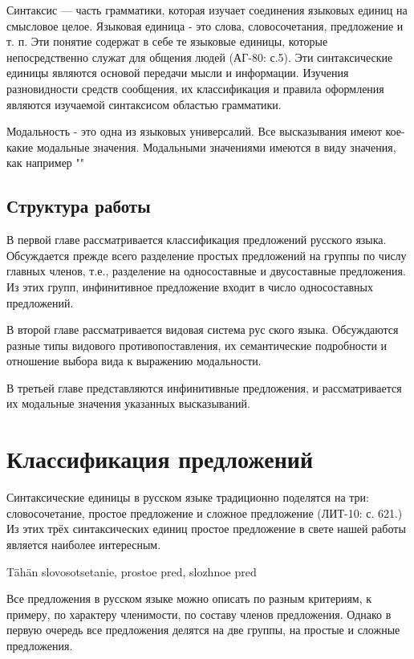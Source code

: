 \documentclass{article}
\begin{document}
Синтаксис --- часть грамматики, которая изучает соединения языковых единиц на смысловое целое. Языковая единица - это слова, словосочетания, предложение и т. п. Эти понятие содержат в себе те языковые единицы, которые непосредственно служат для общения людей (АГ-80: с.5). Эти синтаксические единицы являются основой передачи мысли и информации. Изучения разновидности средств сообщения, их классификация и правила оформления являются изучаемой синтаксисом областью грамматики.

Модальность - это одна из языковых универсалий. Все высказывания имеют кое-какие модальные значения. Модальными значениями имеются в виду значения, как например "" 


\subsection*{Структура работы}

В первой главе рассматривается классификация предложений русского языка. Обсуждается прежде всего разделение простых предложений на группы по числу главных членов, т.е., разделение на односоставные и двусоставные предложения. Из этих групп, инфинитивное предложение входит в число односоставных предложений.

В второй главе рассматривается видовая система рус ского языка. Обсуждаются разные типы видового противопоставления, их семантические подробности и отношение выбора вида к выражению модальности.  

В третьей главе представляются инфинитивные предложения, и рассматривается их модальные значения указанных высказываний.


\section{Классификация предложений}


 Синтаксические единицы в русском языке традиционно поделятся на три: словосочетание, простое предложение и сложное предложение (ЛИТ-10: с. 621.) Из этих трёх синтаксических единиц простое предложение в свете нашей работы является наиболее интересным. 



Tähän slovosotsetanie, prostoe pred, slozhnoe pred



Все предложения в русском языке можно описать по разным критериям, к примеру, по характеру членимости, по составу членов предложения. Однако в первую очередь все предложения делятся на две группы, на простые и  сложные предложения. 
\end{document}
